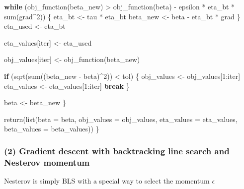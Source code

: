 \documentclass[
  letterpaper,
  DIV=11,
  numbers=noendperiod]{scrartcl}
\newenvironment{Shaded}{\begin{snugshade}}{\end{snugshade}}
\newcommand{\AttributeTok}[1]{\textcolor[rgb]{0.40,0.45,0.13}{#1}}
\newcommand{\ControlFlowTok}[1]{\textcolor[rgb]{0.00,0.23,0.31}{\textbf{#1}}}
\newcommand{\DecValTok}[1]{\textcolor[rgb]{0.68,0.00,0.00}{#1}}
\newcommand{\FunctionTok}[1]{\textcolor[rgb]{0.28,0.35,0.67}{#1}}
\newcommand{\NormalTok}[1]{\textcolor[rgb]{0.00,0.23,0.31}{#1}}
\newcommand{\OtherTok}[1]{\textcolor[rgb]{0.00,0.23,0.31}{#1}}
\newcommand{\SpecialCharTok}[1]{\textcolor[rgb]{0.37,0.37,0.37}{#1}}
\begin{document}
\begin{Shaded}
\begin{Highlighting}[]
    \ControlFlowTok{while}\NormalTok{ (}\FunctionTok{obj\_function}\NormalTok{(beta\_new) }\SpecialCharTok{\textgreater{}} \FunctionTok{obj\_function}\NormalTok{(beta) }\SpecialCharTok{{-}}\NormalTok{ epsilon }\SpecialCharTok{*}\NormalTok{ eta\_bt }\SpecialCharTok{*} \FunctionTok{sum}\NormalTok{(grad}\SpecialCharTok{\^{}}\DecValTok{2}\NormalTok{)) \{}
\NormalTok{      eta\_bt }\OtherTok{\textless{}{-}}\NormalTok{ tau }\SpecialCharTok{*}\NormalTok{ eta\_bt}
\NormalTok{      beta\_new }\OtherTok{\textless{}{-}}\NormalTok{ beta }\SpecialCharTok{{-}}\NormalTok{ eta\_bt }\SpecialCharTok{*}\NormalTok{ grad}
\NormalTok{    \}}
\NormalTok{    eta\_used }\OtherTok{\textless{}{-}}\NormalTok{ eta\_bt}
    
\NormalTok{    eta\_values[iter] }\OtherTok{\textless{}{-}}\NormalTok{ eta\_used}
    
\NormalTok{    obj\_values[iter] }\OtherTok{\textless{}{-}} \FunctionTok{obj\_function}\NormalTok{(beta\_new)}
    
    \ControlFlowTok{if}\NormalTok{ (}\FunctionTok{sqrt}\NormalTok{(}\FunctionTok{sum}\NormalTok{((beta\_new }\SpecialCharTok{{-}}\NormalTok{ beta)}\SpecialCharTok{\^{}}\DecValTok{2}\NormalTok{)) }\SpecialCharTok{\textless{}}\NormalTok{ tol) \{}
\NormalTok{      obj\_values }\OtherTok{\textless{}{-}}\NormalTok{ obj\_values[}\DecValTok{1}\SpecialCharTok{:}\NormalTok{iter]}
\NormalTok{      eta\_values }\OtherTok{\textless{}{-}}\NormalTok{ eta\_values[}\DecValTok{1}\SpecialCharTok{:}\NormalTok{iter]}
      \ControlFlowTok{break}
\NormalTok{    \}}
    
\NormalTok{    beta }\OtherTok{\textless{}{-}}\NormalTok{ beta\_new}
\NormalTok{  \}}
  
  \FunctionTok{return}\NormalTok{(}\FunctionTok{list}\NormalTok{(}\AttributeTok{beta =}\NormalTok{ beta, }\AttributeTok{obj\_values =}\NormalTok{ obj\_values, }\AttributeTok{eta\_values =}\NormalTok{ eta\_values, }\AttributeTok{beta\_values =}\NormalTok{ beta\_values))}
\NormalTok{\}}
\end{Highlighting}
\end{Shaded}

\subsubsection{(2) Gradient descent with backtracking line search and
Nesterov
momentum}\label{gradient-descent-with-backtracking-line-search-and-nesterov-momentum}

Nesterov is simply BLS with a special way to select the momentum
\(\epsilon\)
\end{document}
